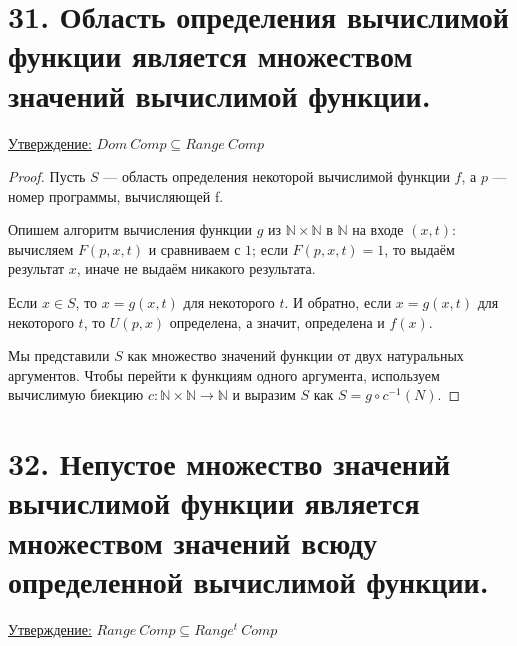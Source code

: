 \documentclass[a4paper, 12pt]{article}
\newcommand{\statement}{\underline{Утверждение:} }
\begin{document}
\section*{31. Область определения вычислимой функции является множеством значений вычислимой функции.}

\statement{$Dom\ Comp \subseteq Range\ Comp$}
        
        \begin{proof}
             Пусть $S$ — область определения некоторой вычислимой функции $f$, а $p$ --- номер программы, вычисляющей f. 
             
            Опишем алгоритм вычисления функции $g$ из $\mathbb N \times \mathbb N$ в $\mathbb N$ на входе $(x, t)$: вычисляем $F(p, x, t)$ и сравниваем с $1$; если $F(p, x, t) = 1$, то выдаём результат $x$, иначе не выдаём никакого результата.

            Если $x \in S$, то $x = g(x, t)$ для некоторого $t$. И обратно, если $x = g(x, t)$ для некоторого $t$, то $U(p, x)$ определена, а значит, определена и $f(x)$.

            Мы представили $S$ как множество значений функции от двух натуральных аргументов. Чтобы перейти к функциям одного аргумента, используем вычислимую биекцию $c : \mathbb N \times \mathbb N \to \mathbb N$ и выразим $S$ как $S = g \circ c^{-1}(N)$.
        \end{proof}

\section*{32. Непустое множество значений вычислимой функции является множеством значений всюду определенной вычислимой функции.}

\statement{$Range\ Comp \subseteq Range^t\ Comp$}
        
\end{document}
